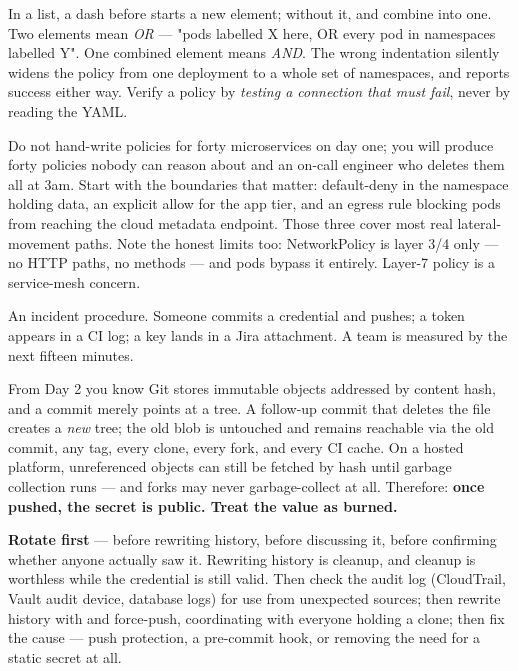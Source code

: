 \begin{secwarn}
In a  list, a dash before  starts a new element; without it,  and  combine into one. Two elements mean \emph{OR} --- "pods labelled X here, OR every pod in namespaces labelled Y". One combined element means \emph{AND}. The wrong indentation silently widens the policy from one deployment to a whole set of namespaces, and  reports success either way. Verify a policy by \emph{testing a connection that must fail}, never by reading the YAML.
\end{secwarn}

 Do not hand-write policies for forty microservices on day one; you will produce forty policies nobody can reason about and an on-call engineer who deletes them all at 3am. Start with the boundaries that matter: default-deny in the namespace holding data, an explicit allow for the app tier, and an egress rule blocking pods from reaching the cloud metadata endpoint. Those three cover most real lateral-movement paths. Note the honest limits too: NetworkPolicy is layer 3/4 only --- no HTTP paths, no methods --- and  pods bypass it entirely. Layer-7 policy is a service-mesh concern.


 An incident procedure. Someone commits a credential and pushes; a token appears in a CI log; a key lands in a Jira attachment. A team is measured by the next fifteen minutes.

 From Day 2 you know Git stores immutable objects addressed by content hash, and a commit merely points at a tree. A follow-up commit that deletes the file creates a \emph{new} tree; the old blob is untouched and remains reachable via the old commit, any tag, every clone, every fork, and every CI cache. On a hosted platform, unreferenced objects can still be fetched by hash until garbage collection runs --- and forks may never garbage-collect at all. Therefore: \textbf{once pushed, the secret is public. Treat the value as burned.}

 \textbf{Rotate first} --- before rewriting history, before discussing it, before confirming whether anyone actually saw it. Rewriting history is cleanup, and cleanup is worthless while the credential is still valid. Then check the audit log (CloudTrail, Vault audit device, database logs) for use from unexpected sources; then rewrite history with  and force-push, coordinating with everyone holding a clone; then fix the cause --- push protection, a pre-commit hook, or removing the need for a static secret at all.

